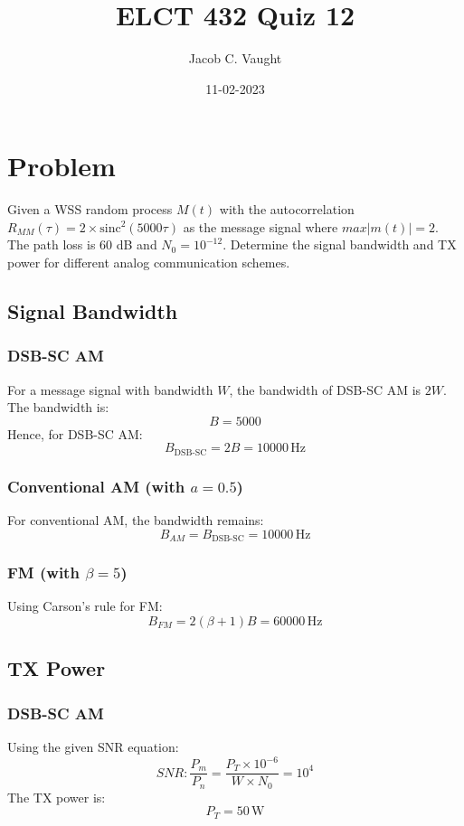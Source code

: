 \documentclass{article}
\begin{document}
\title{ELCT 432 Quiz 12}
\author{Jacob C. Vaught}
\date{11-02-2023}
\maketitle

\section*{Problem}
Given a WSS random process \(M(t)\) with the autocorrelation \(R_{MM}(\tau) = 2 \times \text{sinc}^2(5000\tau)\) as the message signal where \(max|m(t)| = 2\). The path loss is 60 dB and \(N_0 = 10^{-12}\). Determine the signal bandwidth and TX power for different analog communication schemes.

\subsection*{Signal Bandwidth}
\subsubsection*{DSB-SC AM}
For a message signal with bandwidth \(W\), the bandwidth of DSB-SC AM is \(2W\). The bandwidth is:
\[ B = 5000 \]
Hence, for DSB-SC AM:
\[ B_{\text{DSB-SC}} = 2B = 10000 \, \text{Hz} \]

\subsubsection*{Conventional AM (with \( a = 0.5 \))}
For conventional AM, the bandwidth remains:
\[ B_{AM} = B_{\text{DSB-SC}} = 10000 \, \text{Hz} \]

\subsubsection*{FM (with \( \beta = 5 \))}
Using Carson's rule for FM:
\[ B_{FM} = 2(\beta + 1)B = 60000 \, \text{Hz} \]

\subsection*{TX Power}
\subsubsection*{DSB-SC AM}
Using the given SNR equation:
\[ SNR: \frac{P_m}{P_n}=\frac{P_T \times 10^{-6}}{W \times N_0} = 10^4 \]
The TX power is:
\[ P_T = 50 \, \text{W} \]
\end{document}
